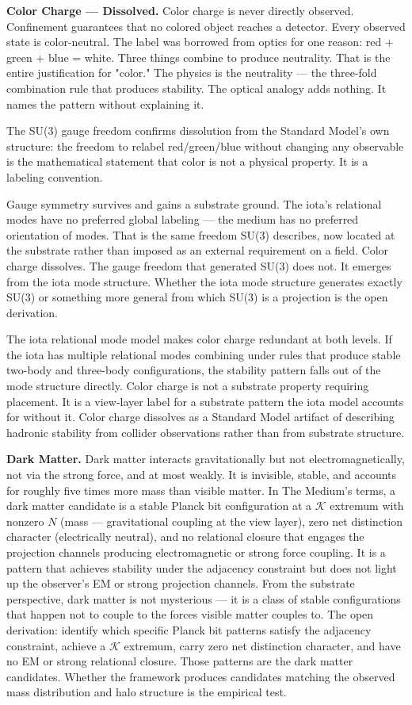 \documentclass[11pt,letterpaper]{article}
\newcommand{\Kappa}{\mathcal{K}}
\begin{document}
\textbf{Color Charge --- Dissolved.} Color charge is never directly observed. Confinement guarantees that no colored object reaches a detector. Every observed state is color-neutral. The label was borrowed from optics for one reason: red + green + blue = white. Three things combine to produce neutrality. That is the entire justification for "color." The physics is the neutrality --- the three-fold combination rule that produces stability. The optical analogy adds nothing. It names the pattern without explaining it.

The SU(3) gauge freedom confirms dissolution from the Standard Model's own structure: the freedom to relabel red/green/blue without changing any observable is the mathematical statement that color is not a physical property. It is a labeling convention.

Gauge symmetry survives and gains a substrate ground. The iota's relational modes have no preferred global labeling --- the medium has no preferred orientation of modes. That is the same freedom SU(3) describes, now located at the substrate rather than imposed as an external requirement on a field. Color charge dissolves. The gauge freedom that generated SU(3) does not. It emerges from the iota mode structure. Whether the iota mode structure generates exactly SU(3) or something more general from which SU(3) is a projection is the open derivation.

The iota relational mode model makes color charge redundant at both levels. If the iota has multiple relational modes combining under rules that produce stable two-body and three-body configurations, the stability pattern falls out of the mode structure directly. Color charge is not a substrate property requiring placement. It is a view-layer label for a substrate pattern the iota model accounts for without it. Color charge dissolves as a Standard Model artifact of describing hadronic stability from collider observations rather than from substrate structure.

\textbf{Dark Matter.} Dark matter interacts gravitationally but not electromagnetically, not via the strong force, and at most weakly. It is invisible, stable, and accounts for roughly five times more mass than visible matter. In The Medium's terms, a dark matter candidate is a stable Planck bit configuration at a \(\Kappa\) extremum with nonzero \(N\) (mass --- gravitational coupling at the view layer), zero net distinction character (electrically neutral), and no relational closure that engages the projection channels producing electromagnetic or strong force coupling. It is a pattern that achieves stability under the adjacency constraint but does not light up the observer's EM or strong projection channels. From the substrate perspective, dark matter is not mysterious --- it is a class of stable configurations that happen not to couple to the forces visible matter couples to. The open derivation: identify which specific Planck bit patterns satisfy the adjacency constraint, achieve a \(\Kappa\) extremum, carry zero net distinction character, and have no EM or strong relational closure. Those patterns are the dark matter candidates. Whether the framework produces candidates matching the observed mass distribution and halo structure is the empirical test.
\end{document}
